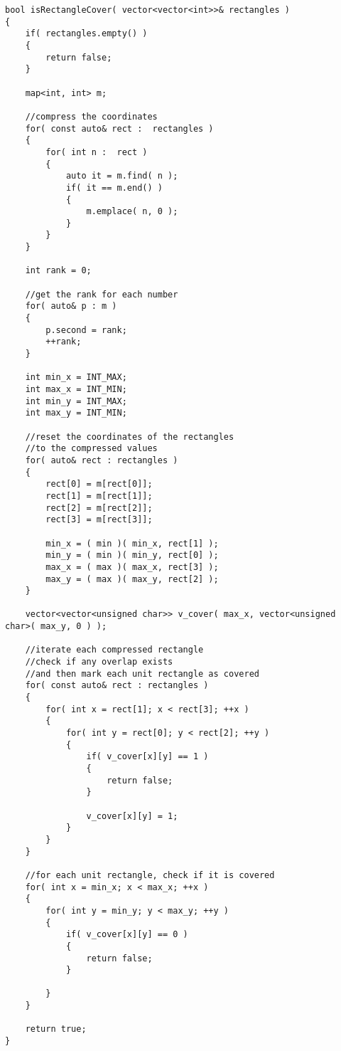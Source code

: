 \setcounter{lstlisting}{0}
\begin{lstlisting}[style=customc, caption={Coordinate Compression}]
bool isRectangleCover( vector<vector<int>>& rectangles )
{
    if( rectangles.empty() )
    {
        return false;
    }

    map<int, int> m;

    //compress the coordinates
    for( const auto& rect :  rectangles )
    {
        for( int n :  rect )
        {
            auto it = m.find( n );
            if( it == m.end() )
            {
                m.emplace( n, 0 );
            }
        }
    }

    int rank = 0;

    //get the rank for each number
    for( auto& p : m )
    {
        p.second = rank;
        ++rank;
    }

    int min_x = INT_MAX;
    int max_x = INT_MIN;
    int min_y = INT_MAX;
    int max_y = INT_MIN;

    //reset the coordinates of the rectangles
    //to the compressed values
    for( auto& rect : rectangles )
    {
        rect[0] = m[rect[0]];
        rect[1] = m[rect[1]];
        rect[2] = m[rect[2]];
        rect[3] = m[rect[3]];

        min_x = ( min )( min_x, rect[1] );
        min_y = ( min )( min_y, rect[0] );
        max_x = ( max )( max_x, rect[3] );
        max_y = ( max )( max_y, rect[2] );
    }

    vector<vector<unsigned char>> v_cover( max_x, vector<unsigned char>( max_y, 0 ) );

    //iterate each compressed rectangle
    //check if any overlap exists
    //and then mark each unit rectangle as covered
    for( const auto& rect : rectangles )
    {
        for( int x = rect[1]; x < rect[3]; ++x )
        {
            for( int y = rect[0]; y < rect[2]; ++y )
            {
                if( v_cover[x][y] == 1 )
                {
                    return false;
                }

                v_cover[x][y] = 1;
            }
        }
    }

    //for each unit rectangle, check if it is covered
    for( int x = min_x; x < max_x; ++x )
    {
        for( int y = min_y; y < max_y; ++y )
        {
            if( v_cover[x][y] == 0 )
            {
                return false;
            }

        }
    }

    return true;
}
\end{lstlisting}

